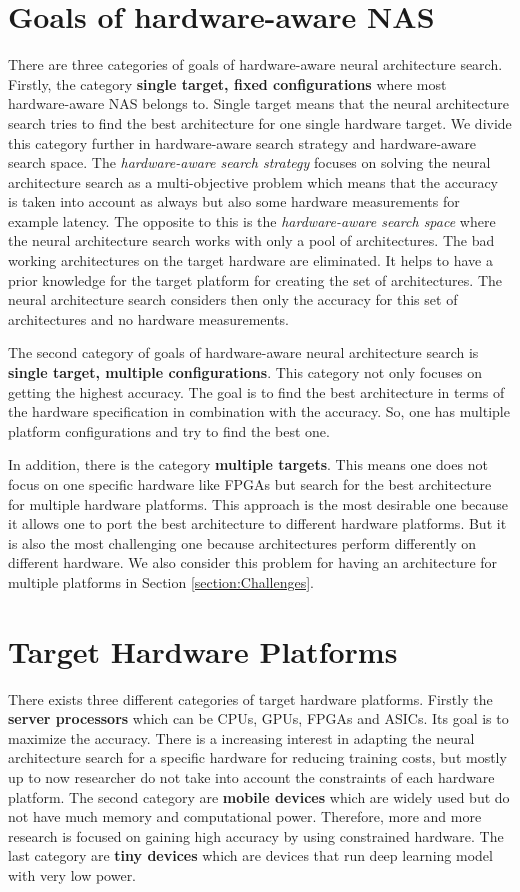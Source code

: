 \documentclass[conference]{IEEEtran}
\begin{document}
\section{Goals of hardware-aware NAS}
\label{section:Goals}
There are three categories of goals of hardware-aware neural architecture search. Firstly, the category \textbf{single target, fixed configurations} where most hardware-aware NAS belongs to. Single target means that the neural architecture search tries to find the best architecture for one single hardware target. We divide this category further in hardware-aware search strategy and hardware-aware search space. The \textit{hardware-aware search strategy} focuses on solving the neural architecture search as a multi-objective problem which means that the accuracy is taken into account as always but also some hardware measurements for example latency. The opposite to this is the \textit{hardware-aware search space} where the neural architecture search works with only a pool of architectures. The bad working architectures on the target hardware are eliminated. It helps to have a prior knowledge for the target platform for creating the set of architectures. The neural architecture search considers then only the accuracy for this set of architectures and no hardware measurements.

The second category of goals of hardware-aware neural architecture search is \textbf{single target, multiple configurations}. This category not only focuses on getting the highest accuracy. The goal is to find the best architecture in terms of the hardware specification in combination with the accuracy. So, one has multiple platform configurations and try to find the best one. 

In addition, there is the category \textbf{multiple targets}. This means one does not focus on one specific hardware like FPGAs but search for the best architecture for multiple hardware platforms. This approach is the most desirable one because it allows one to port the best architecture to different hardware platforms. But it is also the most challenging one because architectures perform differently on different hardware. We also consider this problem for having an architecture for multiple platforms in Section \ref{section:Challenges}.

\section{Target Hardware Platforms}
\label{section:HWPlatforms}
There exists three different categories of target hardware platforms. Firstly the \textbf{server processors} which can be CPUs, GPUs, FPGAs and ASICs. Its goal is to maximize the accuracy. There is a increasing interest in adapting the neural architecture search for a specific hardware for reducing training costs, but mostly up to now researcher do not take into account the constraints of each hardware platform. The second category are \textbf{mobile devices} which are widely used but do not have much memory and computational power. Therefore, more and more research is focused on gaining high accuracy by using constrained hardware. The last category are \textbf{tiny devices} which are devices that run deep learning model with very low power. 
\end{document}

